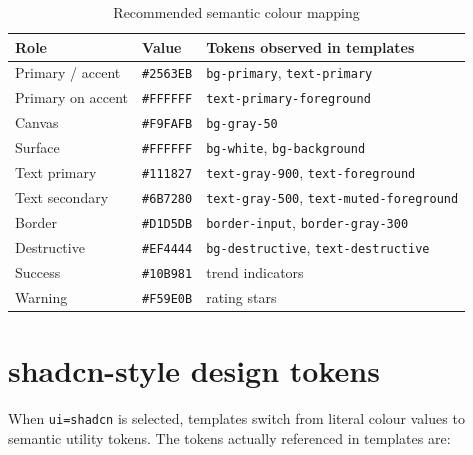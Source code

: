 \begin{table}[H]
\centering
\caption{Recommended semantic colour mapping}
\begin{tabular}{p{4cm}p{2.6cm}p{7.4cm}}
\toprule
\textbf{Role} & \textbf{Value} & \textbf{Tokens observed in templates} \\
\midrule
Primary / accent & \texttt{\#2563EB} & \texttt{bg-primary}, \texttt{text-primary} \\
Primary on accent & \texttt{\#FFFFFF} & \texttt{text-primary-foreground} \\
Canvas & \texttt{\#F9FAFB} & \texttt{bg-gray-50} \\
Surface & \texttt{\#FFFFFF} & \texttt{bg-white}, \texttt{bg-background} \\
Text primary & \texttt{\#111827} & \texttt{text-gray-900}, \texttt{text-foreground} \\
Text secondary & \texttt{\#6B7280} & \texttt{text-gray-500}, \texttt{text-muted-foreground} \\
Border & \texttt{\#D1D5DB} & \texttt{border-input}, \texttt{border-gray-300} \\
Destructive & \texttt{\#EF4444} & \texttt{bg-destructive}, \texttt{text-destructive} \\
Success & \texttt{\#10B981} & trend indicators \\
Warning & \texttt{\#F59E0B} & rating stars \\
\bottomrule
\end{tabular}
\end{table}

\section{shadcn-style design tokens}

When \texttt{ui=shadcn} is selected, templates switch from literal colour values to
semantic utility tokens. The tokens actually referenced in templates are:

